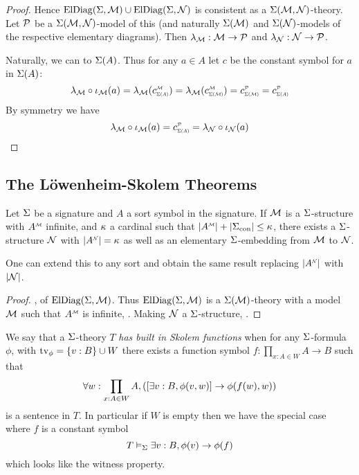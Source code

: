 \begin{proof}
    Hence $\mathrm{ElDiag}(\Sigma,\mathcal{M}) \cup \mathrm{ElDiag}(\Sigma,\mathcal{N})$
    is consistent as a $\Sigma(\mathcal{M},\mathcal{N})$-theory. 
    Let $\mathcal{P}$ be a $\Sigma(\mathcal{M},\mathcal{N})$-model of this
    (and naturally $\Sigma(\mathcal{M})$ and $\Sigma(\mathcal{N})$-models of the respective 
    elementary diagrams).
    Then 
    $\lambda_{\mathcal{M}} : \mathcal{M} \to \mathcal{P}$ and $\lambda_{\mathcal{N}} : \mathcal{N} \to \mathcal{P}$.

    Naturally, we can  to $\Sigma(A)$.
    Thus for any $a \in A$ let $c$ be the constant symbol for $a$ in $\Sigma(A)$:
    \[
        \la_\MM \circ \io_\MM(a) = \la_\MM (\subintp{\Si(A)}{\MM}{c})
        = \la_\MM (\subintp{\Si(\MM)}{\MM}{c}) = 
        \subintp{\Si(\MM)}{\PP}{c} = \subintp{\Si(A)}{\PP}{c}
    \]
    By symmetry we have 
    \[
        \la_\MM \circ \io_\MM(a) = \subintp{\Si(A)}{\PP}{c} =
        \la_\NN \circ \io_\NN(a)
    \]
\end{proof}

\subsection{The L\"{o}wenheim-Skolem Theorems}
\begin{prop}
    Let $\Sigma$ be a signature and $A$ a sort symbol in the signature.
    If $\mathcal{M}$ is a $\Sigma$-structure with $\mmintp{A}$ infinite,
    and $\kappa$ a cardinal such that 
    $|\mmintp{A}|+ |\const{\Si}| \leq \ka$,
    there exists a $\Sigma$-structure $\mathcal{N}$ with
    $\abs{\nnintp{A}} = \ka$ as well as an elementary 
    $\Sigma$-embedding from $\mathcal{M}$ to $\mathcal{N}$.
    
    One can extend this to any sort and obtain the same result replacing 
    $\abs{\nnintp{A}}$ with $\left\vert \mathcal{N} \right\vert$.
\end{prop}
\begin{proof}
    ,
    of $\mathrm{ElDiag}(\Sigma,\mathcal{M})$.
    Thus $\mathrm{ElDiag}(\Sigma,\mathcal{M})$ is a 
    $\Sigma(\mathcal{M})$-theory with a model $\mathcal{M}$ 
    such that $\mmintp{A}$ is infinite,
    .
    Making $\mathcal{N}$ a $\Sigma$-structure, 
    .
\end{proof}

\begin{dfn}
    We say that a $\Sigma$-theory $T$ 
    \emph{has built in Skolem functions} when for any $\Sigma$-formula $\phi$, 
    with $\textrm{tv}_{\phi} = \left\{v : B\right\} \cup W$
    there exists a function symbol $f : \prod_{x : A \in W} A \to B$ 
    such that 
    \[
        \forall w : \prod_{x : A \in W} A , 
        \left(\left[\exists v : B, \phi(v,w)\right] \to \phi(f(w),w)\right)   
    \]
    is a sentence in $T$.
    In particular if $W$ is empty then we have the special case where 
    $f$ is a constant symbol
    \[
        T \vDash_{\Sigma}  
        \exists v : B, \phi(v) \to \phi(f)
    \]
    which looks like the witness property. 
\end{dfn}

